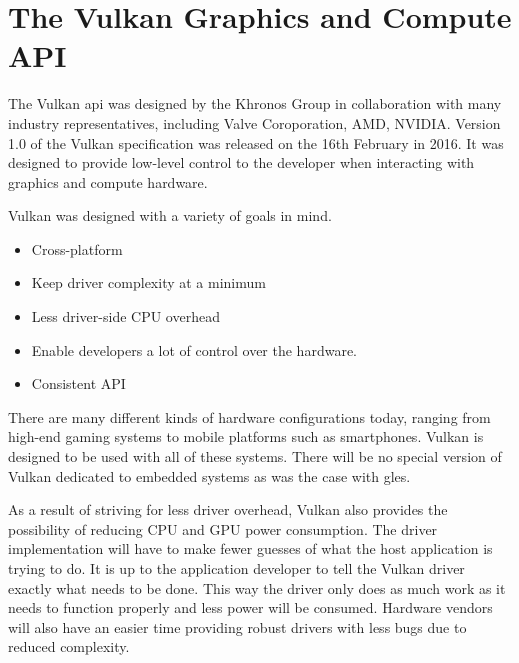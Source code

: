 

  \section{The Vulkan Graphics and Compute API}

    The Vulkan \gls{api} was designed by the Khronos Group in collaboration with many industry representatives, including Valve Coroporation, AMD, NVIDIA. Version 1.0 of the Vulkan specification was released on the 16th February in 2016. It was designed to provide low-level control to the developer when interacting with graphics and compute hardware.

    Vulkan was designed with a variety of goals in mind.

    \begin{itemize}
      \item Cross-platform
      \item Keep driver complexity at a minimum
      \item Less driver-side CPU overhead
      \item Enable developers a lot of control over the hardware.
      \item Consistent API
    \end{itemize}

    There are many different kinds of hardware configurations today, ranging from high-end gaming systems to mobile platforms such as smartphones. Vulkan is designed to be used with all of these systems. There will be no special version of Vulkan dedicated to embedded systems as was the case with \gls{gles}.

    As a result of striving for less driver overhead, Vulkan also provides the possibility of reducing CPU and GPU power consumption. The driver implementation will have to make fewer guesses of what the host application is trying to do. It is up to the application developer to tell the Vulkan driver exactly what needs to be done. This way the driver only does as much work as it needs to function properly and less power will be consumed. Hardware vendors will also have an easier time providing robust drivers with less bugs due to reduced complexity.

